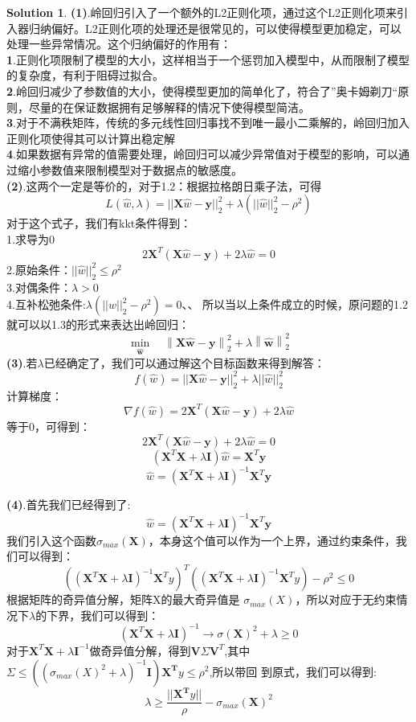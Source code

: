 \documentclass[a4paper]{article}
\numberwithin{equation}{section}
\theoremstyle{definition}
\newtheorem*{solution}{Solution}
\def \X {\mathbf{X}}
\def \wh {\hat{\bm{w}}}
\def \y {\bm{y}}
\newcommand\norm[1]{\left\| #1 \right\|}
\begin{document}
\begin{solution}
	\textbf{(1)}.岭回归引入了一个额外的L2正则化项，通过这个L2正则化项来引入器归纳偏好。L2正则化项的处理还是很常见的，可以使得模型更加稳定，可以处理一些异常情况。这个归纳偏好的作用有：\\
	\textbf{1}.正则化项限制了模型的大小，这样相当于一个惩罚加入模型中，从而限制了模型的复杂度，有利于阻碍过拟合。\\
	\textbf{2}.岭回归减少了参数值的大小，使得模型更加的简单化了，符合了”奥卡姆剃刀“原则，尽量的在保证数据拥有足够解释的情况下使得模型简洁。\\
	\textbf{3}.对于不满秩矩阵，传统的多元线性回归事找不到唯一最小二乘解的，岭回归加入正则化项使得其可以计算出稳定解\\
	\textbf{4}.如果数据有异常的值需要处理，岭回归可以减少异常值对于模型的影响，可以通过缩小参数值来限制模型对于数据点的敏感度。\\
	\textbf{(2)}.这两个一定是等价的，对于1.2：根据拉格朗日乘子法，可得\\
	\[
		L(\hat{w}, \lambda) = || \mathbf{X}\hat{w} - \mathbf{y} ||_2^2 + \lambda ( || \hat{w} ||_2^2 - \rho^2)
	\]
	对于这个式子，我们有kkt条件得到：\\
	1.求导为0\[
		2\mathbf{X}^T (\mathbf{X}\hat{w} - \mathbf{y}) + 2\lambda \hat{w} = 0
	\]
	2.原始条件：$||\hat{w}||_2^2 \leq \rho^2$\\
	3.对偶条件：$\lambda>0$\\
	4.互补松弛条件:$\lambda(||\hat{w}||_2^2 - \rho^2) = 0$、、
	所以当以上条件成立的时候，原问题的1.2就可以以1.3的形式来表达出岭回归：
	\[
		\min_{\wh} \quad\norm{\X\wh - \y}_2^2 + \lambda \norm{\wh}_2^2
	\]
	\textbf{(3)}.若$\lambda$已经确定了，我们可以通过解这个目标函数来得到解答：
	\[
		f(\hat{w}) = || \mathbf{X}\hat{w} - \mathbf{y} ||_2^2 + \lambda || \hat{w} ||_2^2
	\]
	计算梯度：
	\[
		\nabla f(\hat{w}) = 2\mathbf{X}^T ( \mathbf{X}\hat{w} - \mathbf{y}) + 2\lambda \hat{w}
	\]
	等于0，可得到：
	\[
		2\mathbf{X}^T ( \mathbf{X}\hat{w} - \mathbf{y}) + 2\lambda \hat{w} = 0
	\]
	\[	
		( \mathbf{X}^T \mathbf{X} + \lambda \mathbf{I}) \hat{w} = \mathbf{X}^T \mathbf{y}
	\]
	\[
		\hat{w} = ( \mathbf{X}^T\mathbf{X} + \lambda \mathbf{I})^{-1} \mathbf{X}^T\mathbf{y}
	\]

	\textbf{(4)}.首先我们已经得到了:
	\[
		\hat{w} = ( \mathbf{X}^T\mathbf{X} + \lambda \mathbf{I})^{-1} \mathbf{X}^T\mathbf{y}
	\]
	我们引入这个函数$\sigma_{max} (\mathbf{X})$，本身这个值可以作为一个上界，通过约束条件，我们可以得到：
	\[
		(( \mathbf{X}^T \mathbf{X} + \lambda \mathbf{I})^{-1} \mathbf{X}^T y)^T((\mathbf{X}^T \mathbf{X} + \lambda \mathbf{I})^{-1} \mathbf{X}^T y) - \rho^2 \leq 0 	
	\]
	根据矩阵的奇异值分解，矩阵X的最大奇异值是 $\sigma_{max}(X)$，所以对应于无约束情况下$\lambda$的下界，我们可以得到：
	\[
		(\mathbf{X}^T \mathbf{X} + \lambda \mathbf{I})^{-1} \rightarrow \sigma(\mathbf{X})^2 + \lambda \geq 0	
	\]
	对于$\mathbf{X}^T \mathbf{X} + \lambda \mathbf{I}^{-1}$做奇异值分解，得到$\mathbf{V} \Sigma \mathbf{V}^T$,其中$\Sigma \leq ((\sigma_{max}(X)^2 + \lambda)^{-1} \mathbf{I}) \mathbf{X^T} y  \leq \rho^2 $,所以带回
	到原式，我们可以得到:
	\[
		\lambda \geq \frac{||\mathbf{X^T} y||}{\rho} - \sigma_{max}(\mathbf{X})^2
	\]	


\end{solution}
\end{document}
